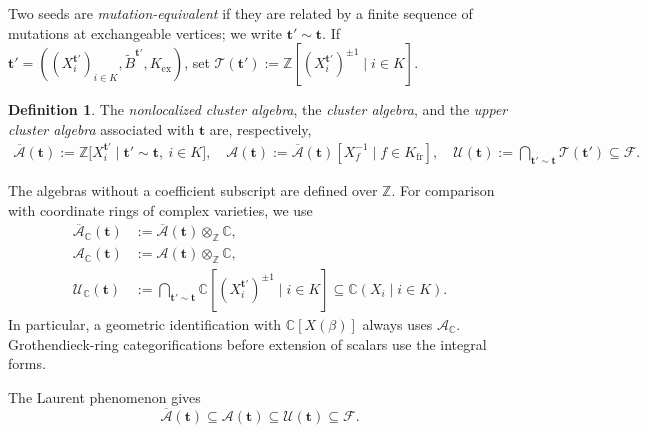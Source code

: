 \documentclass[12pt, reqno]{amsart}
\theoremstyle{plain}
\theoremstyle{definition}
\newtheorem{definition}[theorem]{Definition}
\numberwithin{equation}{section}
\newcommand{\ZZ}{\mathbb{Z}}
\newcommand{\CC}{\mathbb{C}}
\begin{document}
Two seeds are \emph{mutation-equivalent} if they are related by a finite
sequence of mutations at exchangeable vertices; we write
\(\mathbf t'\sim\mathbf t\). If
\(\mathbf t'=((X_i^{\mathbf t'})_{i\in K},
\widetilde B^{\mathbf t'},K_{\mathrm{ex}})\), set
\(\mathcal T(\mathbf t')
:=\ZZ[(X_i^{\mathbf t'})^{\pm1}\mid i\in K]\).

\begin{definition}
    The \emph{nonlocalized cluster algebra}, the \emph{cluster algebra}, and
    the \emph{upper cluster algebra} associated with \(\mathbf t\) are,
    respectively,
    \begin{align*}
        \overline{\mathcal A}(\mathbf t)
        :=\ZZ\bigl[
            X_i^{\mathbf t'}
            \mid \mathbf t'\sim\mathbf t,\ i\in K
        \bigr],\quad
        \mathcal A(\mathbf t)
        :=\overline{\mathcal A}(\mathbf t)
            [X_f^{-1}\mid f\in K_{\mathrm{fr}}],\quad
        \mathcal U(\mathbf t)
        :=\bigcap_{\mathbf t'\sim\mathbf t}
            \mathcal T(\mathbf t')
            \subseteq\mathcal F.
    \end{align*}
\end{definition}

The algebras without a coefficient subscript are defined over
\(\ZZ\). For comparison with coordinate rings of complex varieties,
we use
\begin{equation}\label{eq:complex-cluster-coefficients}
\begin{aligned}
    \overline{\mathcal A}_{\CC}(\mathbf t)
    &:=\overline{\mathcal A}(\mathbf t)\otimes_{\ZZ}\CC,\\
    \mathcal A_{\CC}(\mathbf t)
    &:=\mathcal A(\mathbf t)\otimes_{\ZZ}\CC,\\
    \mathcal U_{\CC}(\mathbf t)
    &:=\bigcap_{\mathbf t'\sim\mathbf t}
       \CC[(X_i^{\mathbf t'})^{\pm1}\mid i\in K]
       \subseteq\CC(X_i\mid i\in K).
\end{aligned}
\end{equation}
In particular, a geometric identification with \(\CC[X(\beta)]\)
always uses \(\mathcal A_{\CC}\). Grothendieck-ring
categorifications before extension of scalars use the integral forms.

The Laurent phenomenon gives
\begin{equation}\label{eq:classical-inclusions}
    \overline{\mathcal A}(\mathbf t)
    \subseteq\mathcal A(\mathbf t)
    \subseteq\mathcal U(\mathbf t)
    \subseteq\mathcal F.
\end{equation}
\end{document}
